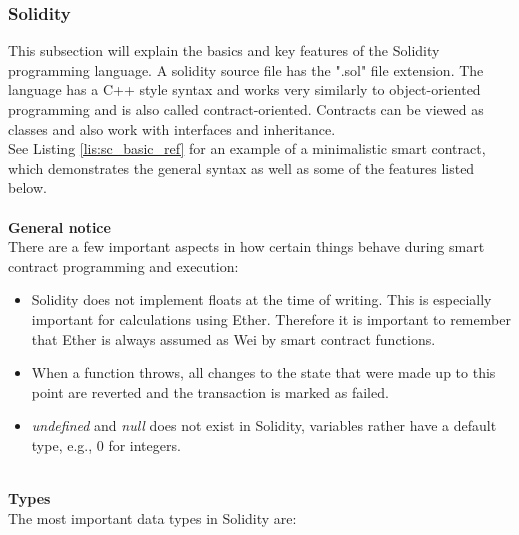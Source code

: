 \subsubsection{Solidity}
This subsection will explain the basics and key features of the Solidity programming language.
A solidity source file has the ".sol" file extension.
The language has a C++ style syntax and works very similarly to object-oriented programming and is also called contract-oriented\cite{doc-oriented}.
Contracts can be viewed as classes and also work with interfaces and inheritance.
\\
See Listing \ref{lis:sc_basic_ref} for an example of a minimalistic smart contract, which demonstrates the general syntax as well as some of the features listed below.
\\\\
\textbf{General notice}\\
There are a few important aspects in how certain things behave during smart contract programming and execution:
\begin{itemize}
  \item Solidity does not implement floats at the time of writing.
  This is especially important for calculations using Ether.
  Therefore it is important to remember that Ether is always assumed as Wei by smart contract functions.
  \item When a function throws, all changes to the state that were made up to this point are reverted and the transaction is marked as failed.
  \item \textit{undefined} and \textit{null} does not exist in Solidity, variables rather have a default type, e.g., 0 for integers\cite{doc-types}.
\end{itemize}
\leavevmode
\\
\textbf{Types}\\
The most important data types in Solidity are\cite{doc-types}:
